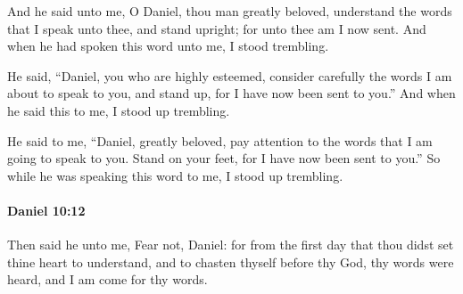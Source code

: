 			\begin{versebox}
					\item[BHS] 
					\item[LXX] 
					\item[ASV] And he said unto me, O Daniel, thou man greatly beloved, understand the words that I speak unto thee, and stand upright; for unto thee am I now sent. And when he had spoken this word unto me, I stood trembling.
					\item[NIV] He said, “Daniel, you who are highly esteemed, consider carefully the words I am about to speak to you, and stand up, for I have now been sent to you.” And when he said this to me, I stood up trembling.
					\item[NRSV] He said to me, “Daniel, greatly beloved, pay attention to the words that I am going to speak to you. Stand on your feet, for I have now been sent to you.” So while he was speaking this word to me, I stood up trembling.
			\end{versebox}

		\paragraph{Daniel 10:12} %
			\label{DANIEL-10-12}

			Then said he unto me, Fear not, Daniel: for from the first day that thou didst set thine heart to understand, and to chasten thyself before thy God, thy words were heard, and I am come for thy words.


